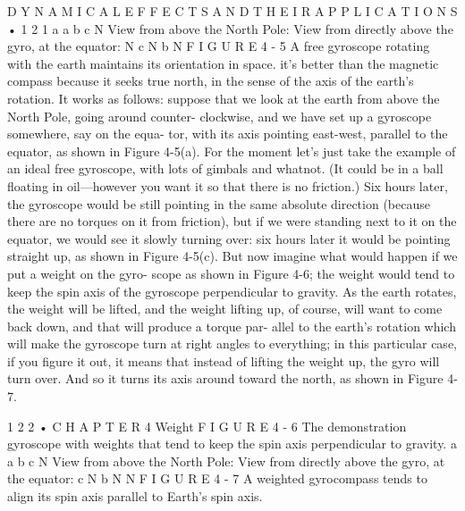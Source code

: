 \documentclass[10pt,oneside]{article}
\begin{document}
D Y N A M I C A L  E F F E C T S  A N D  T H E I R  A P P L I C A T I O N S • 1 2 1 a a b c N View from above the North Pole: View from directly above the gyro, at the equator: N c N b N F I G U R E  4 - 5 A free gyroscope rotating with the earth maintains its orientation in space. it’s better than the magnetic compass because it seeks true north, in the sense of the axis of the earth’s rotation. It works as follows: suppose that we look at the earth from above the North Pole, going around counter- clockwise, and we have set up a gyroscope somewhere, say on the equa- tor, with its axis pointing east-west, parallel to the equator, as shown in Figure 4-5(a). For the moment let’s just take the example of an ideal free gyroscope, with lots of gimbals and whatnot. (It could be in a ball floating in oil---however you want it so that there is no friction.) Six hours later, the gyroscope would be still pointing in the same absolute direction (because there are no torques on it from friction), but if we were standing next to it on the equator, we would see it slowly turning over: six hours later it would be pointing straight up, as shown in Figure 4-5(c). But now imagine what would happen if we put a weight on the gyro- scope as shown in Figure 4-6; the weight would tend to keep the spin axis of the gyroscope perpendicular to gravity. As the earth rotates, the weight will be lifted, and the weight lifting up, of course, will want to come back down, and that will produce a torque par- allel to the earth’s rotation which will make the gyroscope turn at right angles to everything; in this particular case, if you figure it out, it means that instead of lifting the weight up, the gyro will turn over. And so it turns its axis around toward the north, as shown in Figure 4-7.\par

1 2 2 • C H A P T E R  4 Weight F I G U R E  4 - 6 The demonstration gyroscope with weights that tend to keep the spin axis perpendicular to gravity. a a b c N View from above the North Pole: View from directly above the gyro, at the equator: c N b N N F I G U R E  4 - 7 A weighted gyrocompass tends to align its spin axis parallel to Earth’s spin axis.\par
\end{document}
